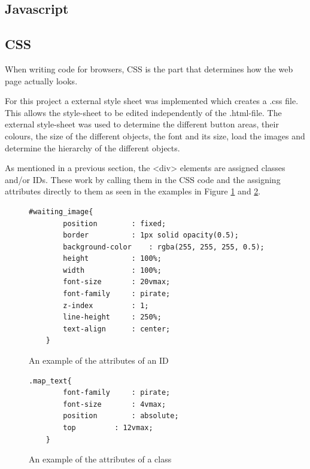 \subsection{Javascript}\label{controllerJavascript}


\subsection{CSS}\label{controllerCSS}
When writing code for browsers, CSS is the part that determines how the web page actually looks.

For this project a external style sheet was implemented which creates a .css file. This allows the style-sheet to be edited independently of the .html-file. The external style-sheet was used to determine the different button areas, their colours, the size of the different objects, the font and its size, load the images and determine the hierarchy of the different objects. 

As mentioned in a previous section, the <div> elements are assigned classes and/or IDs. These work by calling them in the CSS code and the assigning attributes directly to them as seen in the examples in Figure \ref{IDex} and \ref{Classex}. 
\begin{figure}
\begin{lstlisting}
#waiting_image{
		position		: fixed;
		border			: 1px solid opacity(0.5);
		background-color	: rgba(255, 255, 255, 0.5);
		height			: 100%;
		width			: 100%;
		font-size		: 20vmax;
		font-family		: pirate;
		z-index			: 1;
		line-height		: 250%;
		text-align		: center;
	}
\end{lstlisting} 
\caption{An example of the attributes of an ID \label{IDex}}
\end{figure}

\begin{figure}
\begin{lstlisting}
.map_text{
		font-family		: pirate;
		font-size		: 4vmax;
		position		: absolute;
		top			: 12vmax;
	}
\end{lstlisting} 
\caption{An example of the attributes of a class \label{Classex}}
\end{figure}